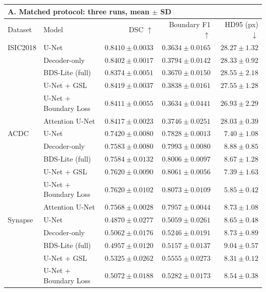 \begin{tabular}{llrrr}
\toprule
\multicolumn{5}{l}{\textbf{A. Matched protocol: three runs, mean $\pm$ SD}} \\
\midrule
Dataset & Model & DSC $\uparrow$ & Boundary F1 $\uparrow$ & HD95 (px) $\downarrow$ \\
\midrule
ISIC2018 & U-Net & $0.8410 \pm 0.0033$ & $0.3634 \pm 0.0165$ & $28.27 \pm 1.32$ \\
 & Decoder-only & $0.8402 \pm 0.0017$ & $0.3794 \pm 0.0142$ & $28.33 \pm 0.92$ \\
 & BDS-Lite (full) & $0.8374 \pm 0.0051$ & $0.3670 \pm 0.0150$ & $28.55 \pm 2.18$ \\
 & U-Net + GSL & $\mathbf{0.8419} \pm 0.0037$ & $\mathbf{0.3838} \pm 0.0161$ & $27.55 \pm 1.28$ \\
 & U-Net + Boundary Loss & $0.8411 \pm 0.0055$ & $0.3634 \pm 0.0441$ & $\mathbf{26.93} \pm 2.29$ \\
 & Attention U-Net & $0.8417 \pm 0.0023$ & $0.3746 \pm 0.0251$ & $28.03 \pm 0.39$ \\
\addlinespace
ACDC & U-Net & $0.7420 \pm 0.0080$ & $0.7828 \pm 0.0013$ & $7.40 \pm 1.08$ \\
 & Decoder-only & $0.7583 \pm 0.0080$ & $0.7993 \pm 0.0080$ & $8.88 \pm 0.85$ \\
 & BDS-Lite (full) & $0.7584 \pm 0.0132$ & $0.8006 \pm 0.0097$ & $8.67 \pm 1.28$ \\
 & U-Net + GSL & $0.7620 \pm 0.0090$ & $0.8061 \pm 0.0056$ & $7.39 \pm 1.63$ \\
 & U-Net + Boundary Loss & $\mathbf{0.7620} \pm 0.0102$ & $\mathbf{0.8073} \pm 0.0109$ & $\mathbf{5.85} \pm 0.42$ \\
 & Attention U-Net & $0.7568 \pm 0.0028$ & $0.7957 \pm 0.0044$ & $8.73 \pm 1.08$ \\
\addlinespace
Synapse & U-Net & $0.4870 \pm 0.0277$ & $0.5059 \pm 0.0261$ & $8.65 \pm 0.48$ \\
 & Decoder-only & $0.5062 \pm 0.0176$ & $0.5246 \pm 0.0191$ & $8.73 \pm 0.89$ \\
 & BDS-Lite (full) & $0.4957 \pm 0.0120$ & $0.5157 \pm 0.0137$ & $9.04 \pm 0.57$ \\
 & U-Net + GSL & $\mathbf{0.5325} \pm 0.0262$ & $\mathbf{0.5555} \pm 0.0273$ & $\mathbf{8.31} \pm 0.12$ \\
 & U-Net + Boundary Loss & $0.5072 \pm 0.0188$ & $0.5282 \pm 0.0173$ & $8.54 \pm 0.38$ \\

\end{tabular}
